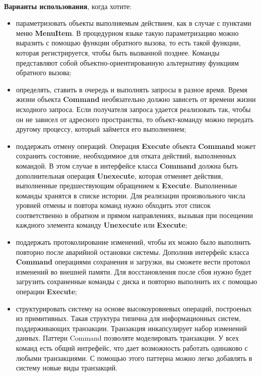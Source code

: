 \documentclass[a3paper,11pt]{report}
\begin{document}
\large\textbf{\\Варианты использования}, когда хотите:
\begin{itemize}
\item параметризовать объекты выполняемым действием, как в случае с пунктами меню \textbf{MenuItem}. В процедурном языке такую параметризацию можно выразить с помощью функции обратного вызова, то есть такой функции, которая регистрируется, чтобы быть вызванной позднее. Команды представляют собой объектно-ориентированную альтернативу функциям обратного вызова;
\item определять, ставить в очередь и выполнять запросы в разное время. Время жизни объекта \textbf{Command} необязательно должно зависеть от времени жизни исходного запроса. Если получателя запроса удается реализовать так, чтобы он не зависел от адресного пространства, то объект-команду можно передать другому процессу, который займется его выполнением;
\item поддержать отмену операций. Операция \textbf{Execute} объекта \textbf{Command} может сохранить состояние, необходимиое для отката действий, выполненных командой. В этом случае в интерфейсе класса \textbf{Command} должна быть дополнительная операция \textbf{Unexecute}, которая отменяет действия, выполненные предшествующим обращением к \textbf{Execute}. Выполненные команды хранятся в списке истории. Для реализации произвольного числа уровней отмены и повтора команд нужно обходить этот список соответственно в обратном и прямом направлениях, вызывая при посещении каждного элемента команду \textbf{Unexecute} или \textbf{Execute};
\item поддержать протоколирование изменений, чтобы их можно было выполнить повторно после аварийной остановки системы. Дополнив интерфейс класса \textbf{Command} операциями сохранения и загрузки, вы сможете вести протокол изменений во внешней памяти. Для восстановления после сбоя нужно будет загрузить сохраненные команды с диска и повторно выполнить их с помощью операции \textbf{Execute};
\item структурировать систему на основе высокоуровневых операций, построеных из примитивных. Такая структура типична для информационных систем, поддерживающих транзакции. Транзакция инкапсулирует набор изменений данных. Паттерн Command позволяте моделировать транзакции. У всех команд есть общий интрефейс, что дает возможность работать одинаково с любыми транзакциями. С помощью этого паттерна можно легко добавлять в систему новые виды транзакций.
\end{itemize}
\end{document}
